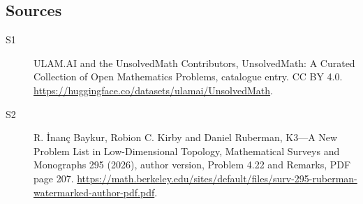 \documentclass[11pt]{article}
\begin{document}
\subsection{Sources}
\begin{description}
\item[\hypertarget{source:statement:1}{S1}] ULAM.AI and the UnsolvedMath Contributors, UnsolvedMath: A Curated Collection of Open Mathematics Problems, catalogue entry. CC BY 4.0. \url{https://huggingface.co/datasets/ulamai/UnsolvedMath}.
\item[\hypertarget{source:statement:2}{S2}] R. İnanç Baykur, Robion C. Kirby and Daniel Ruberman, K3—A New Problem List in Low-Dimensional Topology, Mathematical Surveys and Monographs 295 (2026), author version, Problem 4.22 and Remarks, PDF page 207. \url{https://math.berkeley.edu/sites/default/files/surv-295-ruberman-watermarked-author-pdf.pdf}.
\end{description}
\label{end:statement}
\end{document}

